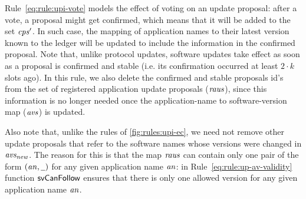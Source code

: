 \clearpage

Rule~\ref{eq:rule:upi-vote} models the effect of voting on an update proposal:
after a vote, a proposal might get confirmed, which means that it will be added
to the set $\mathit{cps'}$. In such case, the mapping of application names to
their latest version known to the ledger will be updated to include the
information in the confirmed proposal. Note that, unlike protocol updates,
software updates take effect as soon as a proposal is confirmed and stable
(i.e. its confirmation occurred at least $2\cdot k$ slots ago). In this rule,
we also delete the confirmed and stable proposals id's from the set of
registered application update proposals ($\mathit{raus}$), since this information
is no longer needed once the application-name to software-version map
($\mathit{avs}$) is updated.

Also note that, unlike the rules of \cref{fig:rules:upi-ec}, we need not remove
other update proposals that refer to the software names whose versions were
changed in $\mathit{avs_{new}}$. The reason for this is that the map $\mathit{raus}$
can contain only one pair of the form $(\var{an}, \wcard)$ for any given
application name $\mathit{an}$: in Rule~\ref{eq:rule:up-av-validity} function
$\mathsf{svCanFollow}$ ensures that there is only one allowed version for any
given application name $\mathit{an}$.

